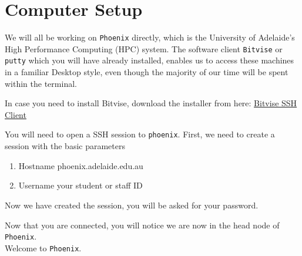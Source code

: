 \section{Computer Setup}
\begin{information}
We will all be working on \texttt{Phoenix} directly, which is the University of Adelaide's High Performance Computing (HPC) system.
The software client \texttt{Bitvise} or \texttt{putty} which you will have already installed, enables us to access these machines in a familiar Desktop style, even though the majority of our time will be spent within the terminal. \\
\end{information}

\begin{warning}
In case you need to install Bitvise, download the installer from here: 
\href{https://www.bitvise.com/ssh-client-download}{Bitvise SSH Client}
\end{warning}

You will need to open a SSH session to \texttt{phoenix}.
First, we need to create a session with the basic parameters
\begin{enumerate}
	\item Hostname phoenix.adelaide.edu.au
	\item Username your student or staff ID
\end{enumerate}

Now we have created the session, you will be asked for your password. \\

\begin{note}
Now that you are connected, you will notice we are now in the head node of \texttt{Phoenix}. \\
Welcome to \texttt{Phoenix}.
\end{note}


